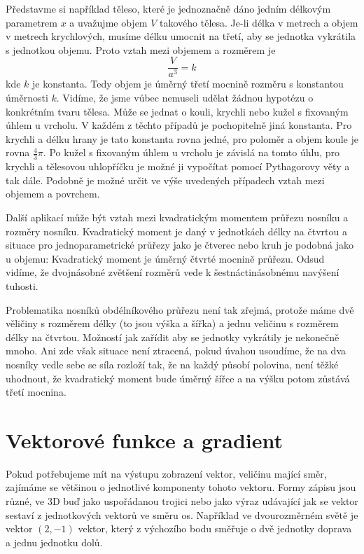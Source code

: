 \documentclass[12pt]{article}
\begin{document}
Představme si například těleso, které je jednoznačně dáno jedním délkovým parametrem $x$ a uvažujme objem $V$ takového tělesa. Je-li délka v metrech a objem v metrech krychlových, musíme délku umocnit na třetí, aby se jednotka vykrátila s jednotkou objemu. Proto vztah mezi objemem a rozměrem je $$\frac{V}{a^3}=k$$
kde $k$ je konstanta. Tedy objem je úměrný třetí mocnině rozměru s konstantou úměrnosti $k$. Vidíme, že jsme vůbec nemuseli udělat žádnou hypotézu o konkrétním tvaru tělesa. Může se jednat o kouli, krychli nebo kužel s fixovaným úhlem u vrcholu. V každém z těchto případů je pochopitelně jiná konstanta. Pro krychli a délku hrany je tato konstanta rovna jedné, pro poloměr a objem koule je rovna $\frac 43 \pi$. Po kužel s fixovaným úhlem u vrcholu je závislá na tomto úhlu, pro krychli a tělesovou uhlopříčku je možné ji vypočítat pomocí Pythagorovy věty a tak dále. Podobně je možné určit ve výše uvedených případech vztah mezi objemem a povrchem.

Další aplikací může být vztah mezi kvadratickým momentem průřezu nosníku a rozměry nosníku. Kvadratický moment je daný v jednotkách délky na čtvrtou a situace pro jednoparametrické průřezy jako je čtverec nebo kruh je podobná jako u objemu: Kvadratický moment je úměrný čtvrté mocnině průřezu. Odsud vidíme, že dvojnásobné zvětšení rozměrů vede k šestnáctinásobnému navýšení tuhosti.

Problematika nosníků obdélníkového průřezu není tak zřejmá, protože máme dvě věličiny s rozměrem délky (to jsou výška a šířka) a jednu veličinu s rozměrem délky na čtvrtou. Možností jak zařídit aby se jednotky vykrátily je nekonečně mnoho. Ani zde však situace není ztracená, pokud úvahou usoudíme, že na dva nosníky vedle sebe se síla rozloží tak, že na každý působí polovina, není těžké uhodnout, že kvadratický moment bude úměrný šířce a na výšku potom zůstává třetí mocnina. 


\section*{Vektorové funkce a gradient}

Pokud potřebujeme mít na výstupu zobrazení vektor, veličinu mající směr, zajímáme se většinou o jednotlivé komponenty tohoto vektoru. Formy zápisu jsou různé, ve 3D buď jako uspořádanou trojici nebo jako výraz udávající jak se vektor sestaví z jednotkových vektorů ve směru os. Například ve dvourozměrném světě je vektor $(2,-1)$ vektor, který z výchozího bodu směřuje o dvě jednotky doprava a jednu jednotku dolů.
\end{document}
